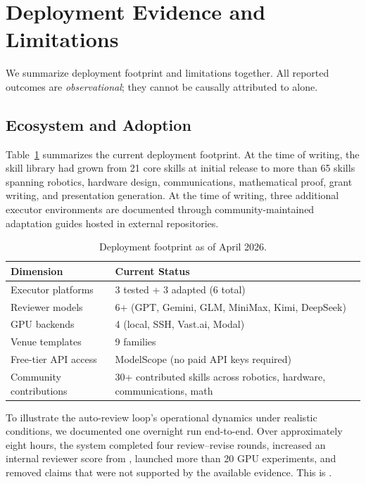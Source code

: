 \section{Deployment Evidence and Limitations}
\label{sec:evidence}

We summarize deployment footprint and limitations together.
All reported outcomes are \emph{observational}; they cannot be causally attributed to \aris{} alone.

\subsection{Ecosystem and Adoption}

Table~\ref{tab:ecosystem} summarizes the current deployment footprint.
At the time of writing, the skill library had grown from 21 core skills at initial release to more than 65 skills spanning robotics, hardware design, communications, mathematical proof, grant writing, and presentation generation.
At the time of writing, three additional executor environments are documented through community-maintained adaptation guides hosted in external repositories.

\begin{table}[t]
\centering
\caption{Deployment footprint as of April 2026.}
\label{tab:ecosystem}
\small
\begin{tabular}{@{}ll@{}}
\toprule
\textbf{Dimension} & \textbf{Current Status} \\
\midrule
Executor platforms & 3 tested + 3 adapted (6 total) \\
Reviewer models & 6+ (GPT, Gemini, GLM, MiniMax, Kimi, DeepSeek) \\
GPU backends & 4 (local, SSH, Vast.ai, Modal) \\
Venue templates & 9 families \\
Free-tier API access & ModelScope (no paid API keys required) \\
Community contributions & 30+ contributed skills across robotics, hardware, communications, math \\
\bottomrule
\end{tabular}
\end{table}

To illustrate the auto-review loop's operational dynamics under realistic conditions, we documented one overnight run end-to-end.
Over approximately eight hours, the system completed four review--revise rounds, increased an internal reviewer score from \MainResult{}, launched more than 20 GPU experiments, and removed claims that were not supported by the available evidence.
This is \MainResultUncertainty{}.

